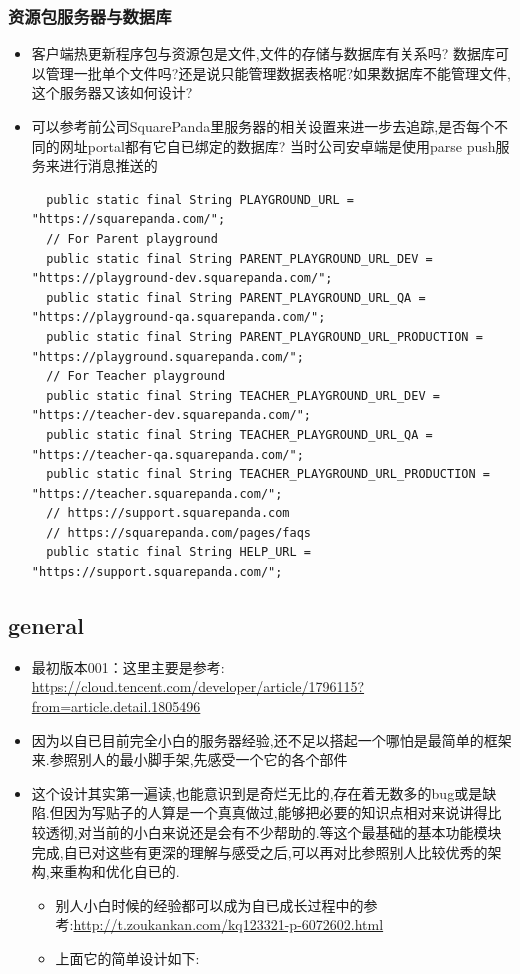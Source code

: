 \documentclass[9pt, b5paper]{article}
\begin{document}
\subsubsection{资源包服务器与数据库}
\label{sec-4-2-1}
\begin{itemize}
\item 客户端热更新程序包与资源包是文件,文件的存储与数据库有关系吗? 数据库可以管理一批单个文件吗?还是说只能管理数据表格呢?如果数据库不能管理文件,这个服务器又该如何设计?
\item 可以参考前公司SquarePanda里服务器的相关设置来进一步去追踪,是否每个不同的网址portal都有它自已绑定的数据库? 当时公司安卓端是使用parse push服务来进行消息推送的
\begin{verbatim}
  public static final String PLAYGROUND_URL = "https://squarepanda.com/";
  // For Parent playground
  public static final String PARENT_PLAYGROUND_URL_DEV = "https://playground-dev.squarepanda.com/";
  public static final String PARENT_PLAYGROUND_URL_QA = "https://playground-qa.squarepanda.com/";
  public static final String PARENT_PLAYGROUND_URL_PRODUCTION = "https://playground.squarepanda.com/";
  // For Teacher playground
  public static final String TEACHER_PLAYGROUND_URL_DEV = "https://teacher-dev.squarepanda.com/";
  public static final String TEACHER_PLAYGROUND_URL_QA = "https://teacher-qa.squarepanda.com/";
  public static final String TEACHER_PLAYGROUND_URL_PRODUCTION = "https://teacher.squarepanda.com/";
  // https://support.squarepanda.com
  // https://squarepanda.com/pages/faqs
  public static final String HELP_URL = "https://support.squarepanda.com/";
\end{verbatim}
\end{itemize}

\subsection{general}
\label{sec-4-3}
\begin{itemize}
\item 最初版本001：这里主要是参考:　\url{https://cloud.tencent.com/developer/article/1796115?from=article.detail.1805496}
\item 因为以自已目前完全小白的服务器经验,还不足以搭起一个哪怕是最简单的框架来.参照别人的最小脚手架,先感受一个它的各个部件
\item 这个设计其实第一遍读,也能意识到是奇烂无比的,存在着无数多的bug或是缺陷.但因为写贴子的人算是一个真真做过,能够把必要的知识点相对来说讲得比较透彻,对当前的小白来说还是会有不少帮助的.等这个最基础的基本功能模块完成,自已对这些有更深的理解与感受之后,可以再对比参照别人比较优秀的架构,来重构和优化自已的. 
\begin{itemize}
\item 别人小白时候的经验都可以成为自已成长过程中的参考:\url{http://t.zoukankan.com/kq123321-p-6072602.html}
\item 上面它的简单设计如下:
\end{itemize}
\end{itemize}
\end{document}
